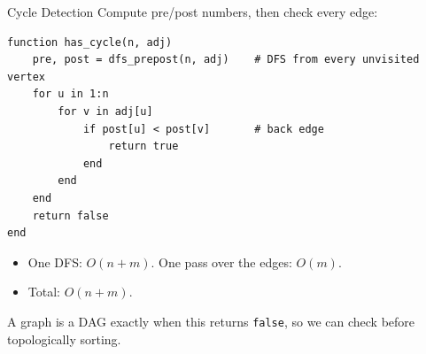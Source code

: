 \documentclass[10pt,aspectratio=169]{beamer}
\begin{document}
\begin{frame}[fragile]{Cycle Detection}
  Compute pre/post numbers, then check every edge:
\begin{lstlisting}[basicstyle=\ttfamily\scriptsize]
function has_cycle(n, adj)
    pre, post = dfs_prepost(n, adj)    # DFS from every unvisited vertex
    for u in 1:n
        for v in adj[u]
            if post[u] < post[v]       # back edge
                return true
            end
        end
    end
    return false
end
\end{lstlisting}

  \medskip
  \begin{itemize}
    \item One DFS: $O(n + m)$. One pass over the edges: $O(m)$.
    \item Total: $O(n + m)$.
  \end{itemize}

  \medskip
  \begin{center}
    \small A graph is a DAG exactly when this returns \texttt{false}, so we
    can check before topologically sorting.
  \end{center}
\end{frame}
\end{document}
